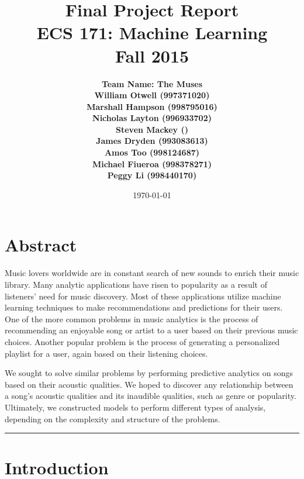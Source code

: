 \documentclass[12pt]{article}
\title{\vspace{-3ex}\bf Final Project Report\\[2ex] 
       \normalsize ECS 171: Machine Learning\\Fall 2015}
\date{\today}
\author{\bf Team Name: The Muses\\ \bf William Otwell (997371020)\\ \bf Marshall Hampson (998795016)\\ \bf Nicholas Layton (996933702)\\ \bf Steven Mackey ()\\ \bf James Dryden (993083613)\\ \bf Amos Too (998124687)\\ \bf Michael Fiueroa (998378271)\\ \bf Peggy Li (998440170)}
\newcommand{\horizontalLine}{
	\begin{center}
		\hrule width 1.0\textwidth
	\end{center}
}
\begin{document}
\maketitle
\pagebreak
\tableofcontents
\pagebreak

\section{Abstract}
\label{sec:abstract}
Music lovers worldwide are in constant search of new sounds to enrich their music library. Many analytic applications have risen to popularity as a result of listeners' need for music discovery. Most of these applications utilize machine learning techniques to make recommendations and predictions for their users. One of the more common problems in music analytics is the process of recommending an enjoyable song or artist to a user based on their previous music choices. Another popular problem is the process of generating a personalized playlist for a user, again based on their listening choices. 

We sought to solve similar problems by performing predictive analytics on songs based on their acoustic qualities. We hoped to discover any relationship between a song's acoustic qualities and its inaudible qualities, such as genre or popularity. Ultimately, we constructed models to perform different types of analysis, depending on the complexity and structure of the problems. 

\horizontalLine
\section{Introduction}
\label{sec:introduction}
\end{document}
